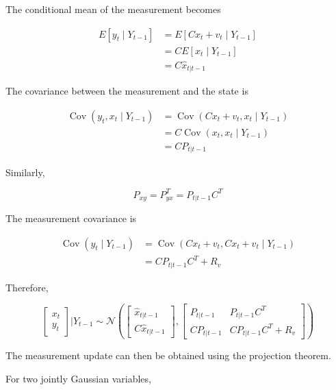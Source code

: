 The conditional mean of the measurement becomes

\begin{align}
    E[y_t \mid Y_{t-1}]
    &=
    E[Cx_t+v_t \mid Y_{t-1}] \\
    &=
    C E[x_t \mid Y_{t-1}] \\
    &=
    C\hat{x}_{t|t-1}
\end{align}

The covariance between the measurement and the state is

\begin{align}
    \operatorname{Cov}
    (y_t,x_t \mid Y_{t-1})
    &=
    \operatorname{Cov}
    (Cx_t+v_t,x_t \mid Y_{t-1}) \\
    &=
    C\operatorname{Cov}
    (x_t,x_t \mid Y_{t-1}) \\
    &=
    CP_{t|t-1}
\end{align}

Similarly,

\begin{equation}
    P_{xy}
    =
    P_{yx}^{T}
    =
    P_{t|t-1}C^T
\end{equation}

The measurement covariance is

\begin{align}
    \operatorname{Cov}
    (y_t \mid Y_{t-1})
    &=
    \operatorname{Cov}
    (Cx_t+v_t,Cx_t+v_t \mid Y_{t-1}) \\
    &=
    CP_{t|t-1}C^T+R_v
\end{align}

Therefore,

\begin{equation}
\begin{bmatrix}
    x_t \\
    y_t
\end{bmatrix}
\Bigg|
Y_{t-1}
\sim
\mathcal{N}
\left(
\begin{bmatrix}
    \hat{x}_{t|t-1} \\
    C\hat{x}_{t|t-1}
\end{bmatrix},
\begin{bmatrix}
    P_{t|t-1}
    &
    P_{t|t-1}C^T
    \\
    CP_{t|t-1}
    &
    CP_{t|t-1}C^T+R_v
\end{bmatrix}
\right)
\end{equation}

The measurement update can then be obtained using the projection theorem.

For two jointly Gaussian variables,

